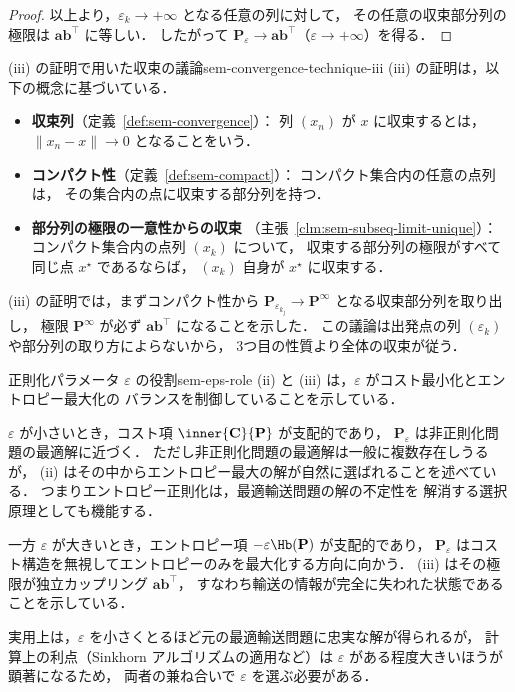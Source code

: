 \begin{proof}
  以上より，$\varepsilon_k \to +\infty$ となる任意の列に対して，
  その任意の収束部分列の極限は $\mathbf{a}\mathbf{b}^\top$ に等しい．
  したがって
  $\mathbf{P}_\varepsilon \to \mathbf{a}\mathbf{b}^\top$（$\varepsilon \to +\infty$）を得る．
\end{proof}

\begin{remark}{(iii) の証明で用いた収束の議論}{sem-convergence-technique-iii}
  (iii) の証明は，以下の概念に基づいている．

  \begin{itemize}
    \item \textbf{収束列}（定義~\ref{def:sem-convergence}）：
      列 $(x_n)$ が $x$ に収束するとは，
      $\|x_n - x\| \to 0$ となることをいう．
    \item \textbf{コンパクト性}（定義~\ref{def:sem-compact}）：
      コンパクト集合内の任意の点列は，
      その集合内の点に収束する部分列を持つ．
    \item \textbf{部分列の極限の一意性からの収束}
      （主張~\ref{clm:sem-subseq-limit-unique}）：
      コンパクト集合内の点列 $(x_k)$ について，
      収束する部分列の極限がすべて同じ点 $x^\star$ であるならば，
      $(x_k)$ 自身が $x^\star$ に収束する．
  \end{itemize}

  (iii) の証明では，まずコンパクト性から
  $\mathbf{P}_{\varepsilon_{k_j}} \to \mathbf{P}^\infty$
  となる収束部分列を取り出し，
  極限 $\mathbf{P}^\infty$ が必ず $\mathbf{a}\mathbf{b}^\top$ になることを示した．
  この議論は出発点の列 $(\varepsilon_k)$ や部分列の取り方によらないから，
  3つ目の性質より全体の収束が従う．
\end{remark}

\begin{remark}{正則化パラメータ $\varepsilon$ の役割}{sem-eps-role}
  (ii) と (iii) は，$\varepsilon$ がコスト最小化とエントロピー最大化の
  バランスを制御していることを示している．

  $\varepsilon$ が小さいとき，コスト項 $\inner{\mathbf{C}}{\mathbf{P}}$ が支配的であり，
  $\mathbf{P}_\varepsilon$ は非正則化問題の最適解に近づく．
  ただし非正則化問題の最適解は一般に複数存在しうるが，
  (ii) はその中からエントロピー最大の解が自然に選ばれることを述べている．
  つまりエントロピー正則化は，最適輸送問題の解の不定性を
  解消する選択原理としても機能する．

  一方 $\varepsilon$ が大きいとき，エントロピー項 $-\varepsilon\Hb(\mathbf{P})$ が支配的であり，
  $\mathbf{P}_\varepsilon$ はコスト構造を無視してエントロピーのみを最大化する方向に向かう．
  (iii) はその極限が独立カップリング $\mathbf{a}\mathbf{b}^\top$，
  すなわち輸送の情報が完全に失われた状態であることを示している．

  実用上は，$\varepsilon$ を小さくとるほど元の最適輸送問題に忠実な解が得られるが，
  計算上の利点（Sinkhorn アルゴリズムの適用など）は
  $\varepsilon$ がある程度大きいほうが顕著になるため，
  両者の兼ね合いで $\varepsilon$ を選ぶ必要がある．
\end{remark}
